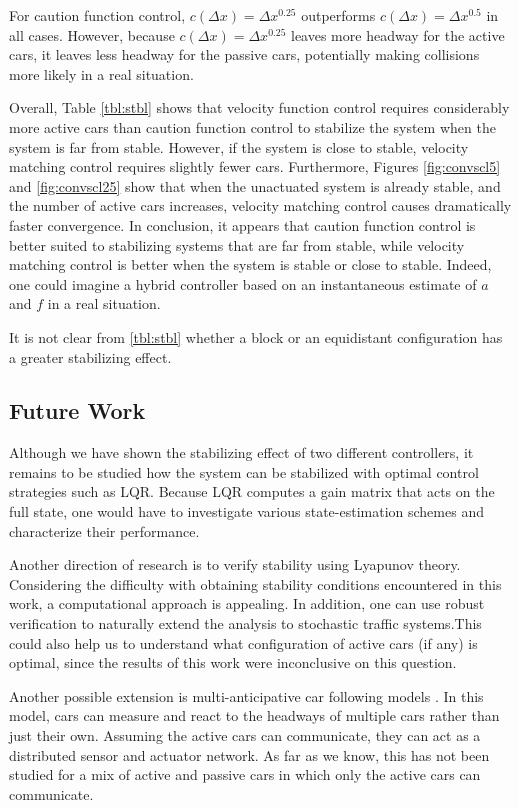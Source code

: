 \documentclass[10pt,twocolumn]{article}
\theoremstyle{ss}
\begin{document}
For caution function control, $c(\Delta x)=\Delta x^{0.25}$ outperforms $c(\Delta x)=\Delta x^{0.5}$ in all cases. However, because $c(\Delta x)=\Delta x^{0.25}$ leaves more headway for the active cars, it leaves less headway for the passive cars, potentially making collisions more likely in a real situation.

Overall, Table \ref{tbl:stbl} shows that velocity function control requires considerably more active cars than caution function control to stabilize the system when the system is far from stable. However, if the system is close to stable, velocity matching control requires slightly fewer cars. Furthermore, Figures \ref{fig:convscl5} and \ref{fig:convscl25} show that when the unactuated system is already stable, and the number of active cars increases, velocity matching control causes dramatically faster convergence. In conclusion, it appears that caution function control is better suited to stabilizing systems that are far from stable, while velocity matching control is better when the system is stable or close to stable. Indeed, one could imagine a hybrid controller based on an instantaneous estimate of $a$ and $f$ in a real situation.

It is not clear from \ref{tbl:stbl} whether a block or an equidistant configuration has a greater stabilizing effect.

\subsection{Future Work}
Although we have shown the stabilizing effect of two different controllers, it remains to be studied how the system can be stabilized with optimal control strategies such as LQR. Because LQR computes a gain matrix that acts on the full state, one would have to investigate various state-estimation schemes and characterize their performance. 

Another direction of research is to verify stability using Lyapunov theory. Considering the difficulty with obtaining stability conditions encountered in this work, a computational approach is appealing. In addition, one can use robust verification to naturally extend the analysis to stochastic traffic systems.This could also help us to understand what configuration of active cars (if any) is optimal, since the results of this work were inconclusive on this question.
 
Another possible extension is multi-anticipative car following models \cite{Lenz}. In this model, cars can measure and react to the headways of multiple cars rather than just their own. Assuming the active cars can communicate, they can act as a distributed sensor and actuator network. As far as we know, this has not been studied for a mix of active and passive cars in which only the active cars can communicate.
\end{document}
